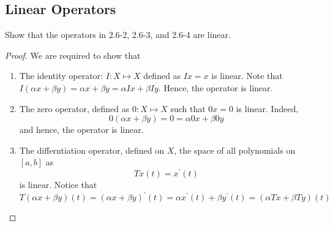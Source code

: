 \subsection{Linear Operators}

\begin{question}
    Show that the operators in 2.6-2, 2.6-3, and 2.6-4 are linear.
    \label{section2.6-1}
\end{question}
\begin{proof}
    We are required to show that
    \begin{enumerate}
        \item The identity operator: $I : X \mapsto X$ defined as $Ix = x$ is linear. Note that
        $I(\alpha x + \beta y) = \alpha x + \beta y = \alpha Ix + \beta Iy$.
        Hence, the operator is linear.
        \item The zero operator, defined as $0 : X \mapsto X$ such that $0x = 0$ is linear. Indeed, 
        \[0(\alpha x + \beta y) = 0 = \alpha 0x + \beta 0y\]
         and hence, the operator is linear.
         \item The differntiation operator, defined on $X$, the space of all polynomials on $[a,b]$ as
         \[Tx(t) = x^\prime(t)\]
         is linear. Notice that
         \[T(\alpha x + \beta y)(t) = (\alpha x + \beta y)^\prime(t) = \alpha x^\prime(t) + \beta y^\prime(t) = (\alpha Tx + \beta Ty)(t)\]
    \end{enumerate}
\end{proof}

